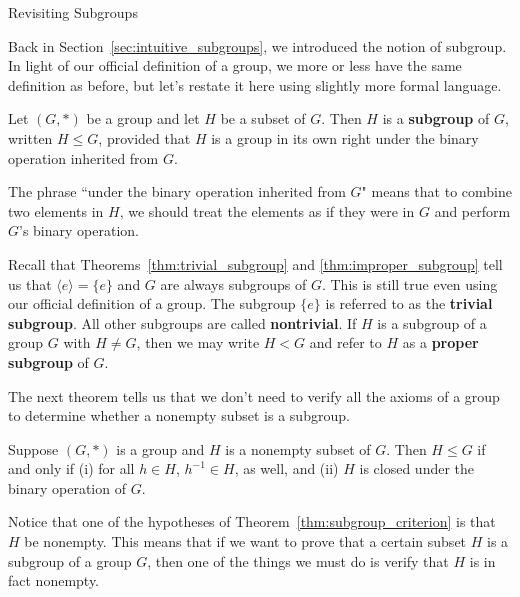 \begin{section}{Revisiting Subgroups}\label{sec:revisiting_isomorphisms}

Back in Section~\ref{sec:intuitive_subgroups}, we introduced the notion of subgroup.  In light of our official definition of a group, we more or less have the same definition as before, but let's restate it here using slightly more formal language.

\begin{definition}
Let $(G,*)$ be a group and let $H$ be a subset of $G$.  Then $H$ is a \textbf{subgroup} of $G$, written $H\leq G$, provided that $H$ is a group in its own right under the binary operation inherited from $G$.
\end{definition}

The phrase ``under the binary operation inherited from $G$" means that to combine two elements in $H$, we should treat the elements as if they were in $G$ and perform $G$'s binary operation.

Recall that Theorems~\ref{thm:trivial_subgroup} and \ref{thm:improper_subgroup} tell us that $\langle e\rangle=\{e\}$ and $G$ are always subgroups of $G$. This is still true even using our official definition of a group.  The subgroup $\{e\}$ is referred to as the \textbf{trivial subgroup}.  All other subgroups are called \textbf{nontrivial}.  If $H$ is a subgroup of a group $G$ with $H\neq G$, then we may write $H<G$ and refer to $H$ as a \textbf{proper subgroup} of $G$.

The next theorem tells us that we don't need to verify all the axioms of a group to determine whether a nonempty subset is a subgroup.

\begin{theorem}\label{thm:subgroup_criterion}
Suppose $(G,*)$ is a group and $H$ is a nonempty subset of $G$.  Then $H\leq G$ if and only if (i) for all $h\in H$, $h^{-1} \in H$, as well, and (ii) $H$ is closed under the binary operation of $G$.
\end{theorem}

\begin{remark}
Notice that one of the hypotheses of Theorem~\ref{thm:subgroup_criterion} is that $H$ be nonempty.  This means that if we want to prove that a certain subset $H$ is a subgroup of a group $G$, then one of the things we must do is verify that $H$ is in fact nonempty.


\end{remark}
\end{section}
